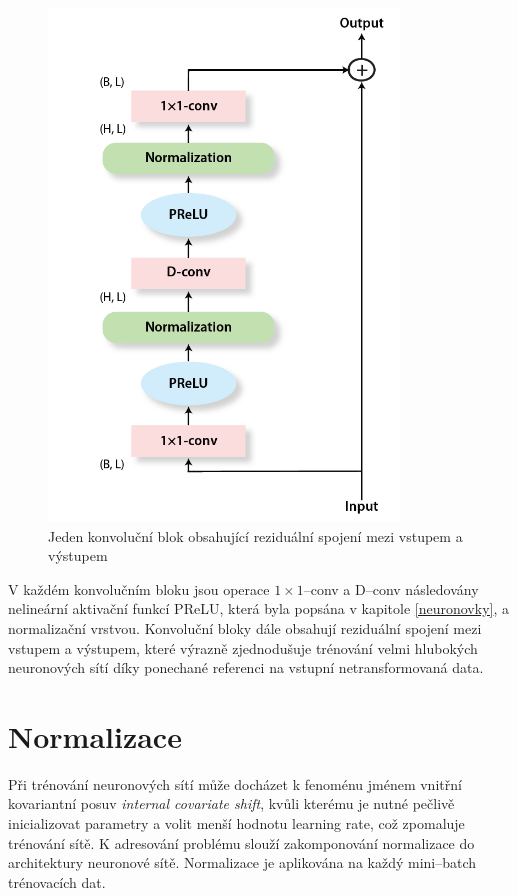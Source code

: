 \begin{figure}[H]
    \centering
    \includegraphics[scale=0.5]{obrazky-figures/conv-res-block.png}
    \caption{\label{fig:tasnet-convblock}Jeden konvoluční blok obsahující reziduální spojení mezi vstupem a výstupem}
\end{figure}

V každém konvolučním bloku jsou operace $1 \times 1$--conv a D--conv následovány nelineární aktivační funkcí PReLU\cite{he2015delving}, která byla popsána v kapitole \ref{neuronovky}, a normalizační vrstvou. Konvoluční bloky dále obsahují reziduální spojení\cite{he2015deep} mezi vstupem a výstupem, které výrazně zjednodušuje trénování velmi hlubokých neuronových sítí díky ponechané referenci na vstupní netransformovaná data.


\section{Normalizace}
Při trénování neuronových sítí může docházet k fenoménu jménem  vnitřní kovariantní posuv \textit{internal covariate shift}, kvůli kterému je nutné pečlivě inicializovat parametry a volit menší hodnotu learning rate, což zpomaluje trénování sítě. K adresování problému slouží zakomponování normalizace do architektury neuronové sítě. Normalizace je aplikována na každý mini--batch trénovacích dat\cite{ioffe2015batch}\cite{ba2016layer}.

